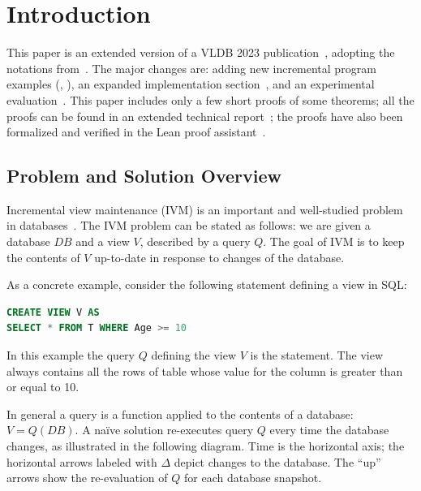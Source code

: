 \section{Introduction}\label{sec:introduction}

This paper is an extended version of a VLDB 2023
publication~\cite{budiu-vldb23}, adopting the notations
from~\cite{budiu-sigmod24}.  The major changes are: adding new
incremental program examples (,
), an expanded
implementation section~, and an
experimental evaluation~.  This paper includes
only a few short proofs of some theorems; all the proofs can be found
in an extended technical report~\cite{tr}; the proofs have also been
formalized and verified in the Lean proof
assistant~\cite{dbsp-theory}.

\subsection{Problem and Solution Overview}\label{sec:intro-incremental}

Incremental view maintenance (IVM) is an important and well-studied
problem in databases~\cite{gupta-idb95}.  The IVM problem can be
stated as follows: we are given a database $DB$ and a view $V$,
described by a query $Q$.  The goal of IVM is to keep the contents of
$V$ up-to-date in response to changes of the database.

As a concrete example, consider the following statement defining a
view in SQL:

\begin{lstlisting}[language=SQL]
CREATE VIEW V AS
SELECT * FROM T WHERE Age >= 10
\end{lstlisting}

In this example the query $Q$ defining the view $V$ is the
 statement.  The view  always contains all the
rows of table  whose value for the column  is
greater than or equal to 10.

In general a query is a function applied to the contents of a
database: $V = Q(DB)$.  A na\"ive solution re-executes query $Q$ every
time the database changes, as illustrated in the following diagram.
Time is the horizontal axis; the horizontal arrows labeled with
$\Delta$ depict changes to the database.  The ``up'' arrows show the
re-evaluation of $Q$ for each database snapshot.


